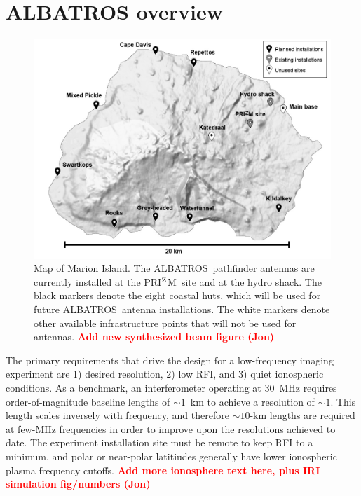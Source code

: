 \documentclass{ws-jai}
\def\albatros{ALBATROS}
\def\prizm{PRI$^{\rm Z}$M}
\begin{document}
\section{ALBATROS overview}

\begin{figure}
  \begin{center}
    \includegraphics[width=0.7\linewidth]{Figures/marion_map/marion_map_annotated.jpg}
    \caption{Map of Marion Island.  The \albatros\ pathfinder antennas
      are currently installed at the \prizm\ site and at the hydro
      shack.  The black markers denote the eight coastal huts, which
      will be used for future \albatros\ antenna installations.  The
      white markers denote other available infrastructure points that
      will not be used for antennas.  \textcolor{red}{\bf Add new
        synthesized beam figure (Jon)}}
    \label{Fig:marion}
  \end{center}
\end{figure}


The primary requirements that drive the design for a low-frequency
imaging experiment are 1) desired resolution, 2) low RFI, and 3) quiet
ionospheric conditions.  As a benchmark, an interferometer operating
at 30~MHz requires order-of-magnitude baseline lengths of $\sim 1$~km
to achieve a resolution of $\sim 1$\degree.  This length scales
inversely with frequency, and therefore $\sim 10$-km lengths are
required at few-MHz frequencies in order to improve upon the
resolutions achieved to date.  The experiment installation site must
be remote to keep RFI to a minimum, and polar or near-polar latitiudes
generally have lower ionospheric plasma frequency cutoffs.
\textcolor{red}{\bf Add more ionosphere text here, plus IRI simulation
  fig/numbers (Jon)}
\end{document}
